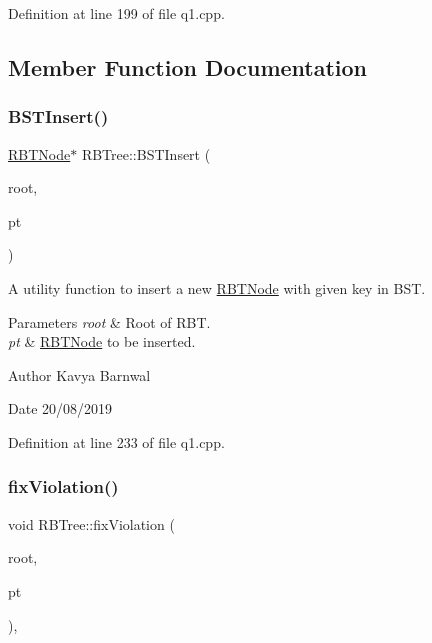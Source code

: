 Definition at line 199 of file q1.\+cpp.



\subsection{Member Function Documentation}
\mbox{\label{class_r_b_tree_ac4d5b255ece286dc3fdd791d2a46bded}} 
\subsubsection{\texorpdfstring{B\+S\+T\+Insert()}{BSTInsert()}}
{\footnotesize\ttfamily \hyperlink{struct_r_b_t_node}{R\+B\+T\+Node}$\ast$ R\+B\+Tree\+::\+B\+S\+T\+Insert (\begin{DoxyParamCaption}\item[{\hyperlink{struct_r_b_t_node}{R\+B\+T\+Node} $\ast$}]{root,  }\item[{\hyperlink{struct_r_b_t_node}{R\+B\+T\+Node} $\ast$}]{pt }\end{DoxyParamCaption})\hspace{0.3cm}{\ttfamily [inline]}}

A utility function to insert a new \hyperlink{struct_r_b_t_node}{R\+B\+T\+Node} with given key in B\+ST. 
\begin{DoxyParams}{Parameters}
{\em root} & Root of R\+BT. \\
\hline
{\em pt} & \hyperlink{struct_r_b_t_node}{R\+B\+T\+Node} to be inserted. \\
\hline
\end{DoxyParams}
\begin{DoxyAuthor}{Author}
Kavya Barnwal 
\end{DoxyAuthor}
\begin{DoxyDate}{Date}
20/08/2019 
\end{DoxyDate}


Definition at line 233 of file q1.\+cpp.

\mbox{\label{class_r_b_tree_a5052e46871a174091018381a92b35728}} 
\subsubsection{\texorpdfstring{fix\+Violation()}{fixViolation()}}
{\footnotesize\ttfamily void R\+B\+Tree\+::fix\+Violation (\begin{DoxyParamCaption}\item[{\hyperlink{struct_r_b_t_node}{R\+B\+T\+Node} $\ast$\&}]{root,  }\item[{\hyperlink{struct_r_b_t_node}{R\+B\+T\+Node} $\ast$\&}]{pt }\end{DoxyParamCaption})\hspace{0.3cm}{\ttfamily [inline]}, {\ttfamily [protected]}}

